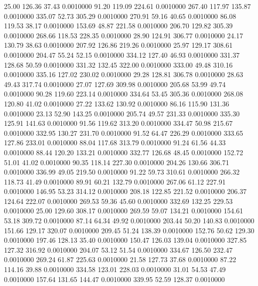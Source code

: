   25.00  126.36   37.43   0.0010000
  91.20  119.09  224.61   0.0010000
 267.40  117.97  135.87   0.0010000
 335.07   52.73  305.29   0.0010000
 270.91   59.16   40.65   0.0010000
  86.08  119.53   38.17   0.0010000
 153.69   48.87  221.58   0.0010000
 206.70  129.82  305.39   0.0010000
 268.66  118.53  228.35   0.0010000
  28.90  124.91  306.77   0.0010000
  24.17  130.79   38.63   0.0010000
 207.92  126.86  219.26   0.0010000
  25.97  129.17  308.61   0.0010000
 204.47   55.24   52.15   0.0010000
 334.12  127.40   46.93   0.0010000
 331.37  128.68   50.59   0.0010000
 331.32  132.45  322.00   0.0010000
 333.00   49.48  310.16   0.0010000
 335.16  127.02  230.02   0.0010000
  29.28  128.81  306.78   0.0010000
  28.63   49.43  317.74   0.0010000
  27.07  127.69  309.98   0.0010000
 205.68   53.99   49.74   0.0010000
  90.28  119.60  223.14   0.0010000
 334.64   53.45  305.36   0.0010000
 268.08  120.80   41.02   0.0010000
  27.22  133.62  130.92   0.0010000
  86.16  115.90  131.36   0.0010000
  23.13   52.90  143.25   0.0010000
 205.74   49.57  231.33   0.0010000
 335.30  125.91  141.63   0.0010000
  91.56  119.62  313.20   0.0010000
 334.47   50.98  215.67   0.0010000
 332.95  130.27  231.70   0.0010000
  91.52   64.47  226.29   0.0010000
 333.65  127.86  233.01   0.0010000
  88.04  117.68  313.79   0.0010000
  91.24   61.56   44.33   0.0010000
  88.44  120.20  133.21   0.0010000
 332.77  126.68   48.45   0.0010000
 152.72   51.01   41.02   0.0010000
  90.35  118.14  227.30   0.0010000
 204.26  130.66  306.71   0.0010000
 336.99   49.05  219.50   0.0010000
  91.22   59.73  310.61   0.0010000
 266.32  118.73   41.49   0.0010000
  89.91   60.21  132.79   0.0010000
 267.06   61.12  227.91   0.0010000
 146.95   53.23  314.12   0.0010000
 208.18  122.85  221.52   0.0010000
 206.37  124.64  222.07   0.0010000
 269.53   59.36   45.60   0.0010000
 332.69  132.25  229.53   0.0010000
  25.00  129.60  308.17   0.0010000
 269.59   59.07  134.21   0.0010000
 154.61   53.18  309.72   0.0010000
  87.14   64.34   49.92   0.0010000
 203.44   50.20  140.83   0.0010000
 151.66  129.17  320.07   0.0010000
 209.45   51.24  138.39   0.0010000
 152.76   50.62  129.30   0.0010000
 197.46  128.13   35.40   0.0010000
 150.47  126.03  139.04   0.0010000
 327.85  127.32  316.92   0.0010000
 204.07   53.12   51.54   0.0010000
 334.67  126.50  232.47   0.0010000
 269.24   61.87  225.63   0.0010000
  21.58  127.73   37.68   0.0010000
  87.22  114.16   39.88   0.0010000
 334.58  123.01  228.03   0.0010000
  31.01   54.53   47.49   0.0010000
 157.64  131.65  144.47   0.0010000
 339.95   52.59  128.37   0.0010000
